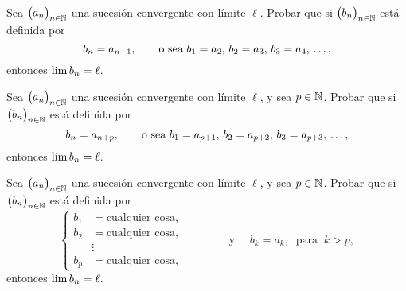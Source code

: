 \item Sea $\big( a_n \big)_{n\in\mathbb{N}}$ una sucesión convergente con límite $\ell$. Probar que si $\big(b_n \big)_{n\in\mathbb{N}}$ está definida por 
\[
b_n = a_{n+1}, \qquad \text{o sea $b_1=a_2$, $b_2=a_3$, $b_3=a_4$, \dots},
\]
entonces $\displaystyle\lim b_n = \ell$.

\item Sea $\big( a_n \big)_{n\in\mathbb{N}}$ una sucesión convergente con límite $\ell$, y sea $p\in\mathbb{N}$.
Probar que si $\big(b_n \big)_{n\in\mathbb{N}}$ está definida por 
\[
b_n = a_{n+p}, \qquad \text{o sea $b_1=a_{p+1}$, $b_2=a_{p+2}$, $b_3=a_{p+3}$, \dots},
\]
entonces $\displaystyle\lim b_n = \ell$.

\item Sea $\big( a_n \big)_{n\in\mathbb{N}}$ una sucesión convergente con límite $\ell$, y sea $p\in\mathbb{N}$.
Probar que si $\big(b_n \big)_{n\in\mathbb{N}}$ está definida por 
\[
\begin{cases}
    b_1 &= \text{cualquier cosa},\\
b_2 &= \text{cualquier cosa},\\
 &\vdots\\
b_p &= \text{cualquier cosa},
\end{cases}
\qquad\qquad \text{y }\quad b_k = a_k, \ \text{ para } \ k>p,
\]
entonces $\displaystyle\lim b_n = \ell$.
